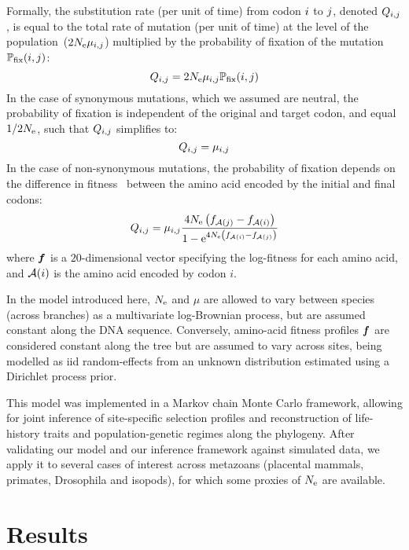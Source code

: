 Formally, the substitution rate (per unit of time) from codon ${i}$ to ${j}$, denoted $Q_{{i}, {j}}$, is equal to the total rate of mutation (per unit of time) at the level of the population~($2N_{\text{e}}\mu_{{i}, {j}}$) multiplied by the probability of fixation of the mutation $\mathbb{P}_{\text{fix}}({i}, {j})$:
\begin{equation}
{Q_{{i}, {j}}}
    = 2 N_{\text{e}} \mu_{{i}, {j}} \mathbb{P}_{\text{fix}}({i}, {j})
\end{equation}
In the case of synonymous mutations, which we assumed are neutral, the probability of fixation is independent of the original and target codon, and equal $1/2 N_{\text{e}}$, such that ${Q_{{i}, {j}}}$ simplifies to:
\begin{equation}
    Q_{{i}, {j}} = \mu_{{i}, {j}}
\end{equation}
In the case of non-synonymous mutations, the probability of fixation depends on the difference in fitness~\citep{Ohta1992} between the amino acid encoded by the initial and final codons:
\begin{equation}
    \label{eq:mutationSelection}
    {\submatrix_{\itoj}} = \mu_{\itoj} \dfrac{4 \Ne \left({\fitj - \fiti}\right)}{{1 - \e^{4 \Ne \left({\fiti - \fitj}\right)} }}
\end{equation}
where $\bm{f}$ is a $20$-dimensional vector specifying the log-fitness for each amino acid, and $\mathcal{A}({i})$ is the amino acid encoded by codon $i$.

In the model introduced here, $N_{\text{e}}$ and $\mu$ are allowed to vary between species (across branches) as a multivariate log-Brownian process, but are assumed constant along the DNA sequence.
Conversely, amino-acid fitness profiles $\bm{f}$ are considered constant along the tree but are assumed to vary across sites, being modelled as iid random-effects from an unknown distribution estimated using a Dirichlet process prior.

This model was implemented in a Markov chain Monte Carlo framework, allowing for joint inference of site-specific selection profiles and reconstruction of life-history traits and population-genetic regimes along the phylogeny.
After validating our model and our inference framework against simulated data, we apply it to several cases of interest across metazoans (placental mammals, primates, Drosophila and isopods), for which some proxies of $N_{\text{e}}$ are available.


\section{Results}
\label{sec:Results}

